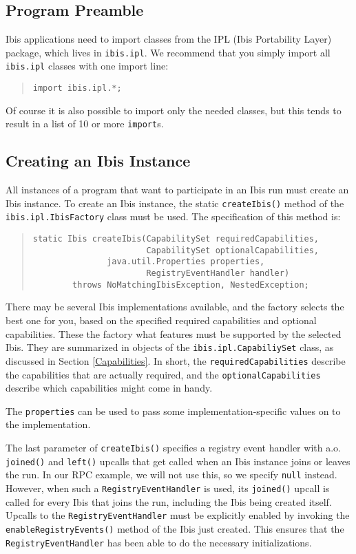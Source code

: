 \documentclass[10pt]{article}
\newcommand{\mysubsection}[1]{\subsection{#1}\label{#1}}
\begin{document}
\subsection{Program Preamble}

Ibis applications need to import classes from the IPL (Ibis
Portability Layer) package, which lives in
\texttt{ibis.ipl}.
We recommend that you simply import all \texttt{ibis.ipl} classes with
one import line:

{\small
\begin{quote}
\begin{verbatim}
import ibis.ipl.*;
\end{verbatim}
\end{quote}
}

\noindent
Of course it is also possible to import only the needed classes, but
this tends to result in a list of 10 or more \texttt{import}s.

\mysubsection{Creating an Ibis Instance}

All instances of a program that want to participate in an Ibis run
must create an Ibis instance.
To create an Ibis instance, the static \texttt{createIbis()} method of the
\texttt{ibis.ipl.IbisFactory} class must be used.
The specification of this method is:
{\small
\begin{quote}
\begin{verbatim}
static Ibis createIbis(CapabilitySet requiredCapabilities,
                       CapabilitySet optionalCapabilities,
		       java.util.Properties properties,
                       RegistryEventHandler handler)
        throws NoMatchingIbisException, NestedException;
\end{verbatim}
\end{quote}
}
There may be several Ibis implementations available, and
the factory selects the best one for you, based on the
specified required capabilities and optional capabilities.
These the factory what features must be supported by the selected Ibis.
They are summarized in objects of the
\texttt{ibis.ipl.CapabiliySet} class, as discussed in Section
\ref{Capabilities}. In short, the \texttt{requiredCapabilities} describe
the capabilities that are actually required, and the
\texttt{optionalCapabilities} describe which capabilities might come in
handy.

The \texttt{properties} can be used to pass some implementation-specific
values on to the implementation. 

The last parameter of \texttt{createIbis()} specifies a registry event
handler with a.o. \texttt{joined()} and \texttt{left()} upcalls that get
called when an Ibis instance joins or leaves the run.
In our RPC example, we will not use this, so we
specify \texttt{null} instead.
However, when such a \texttt{RegistryEventHandler}
is used, its \texttt{joined()} upcall is called for every Ibis that joins the
run, including the Ibis being created itself.
Upcalls to the \texttt{RegistryEventHandler} must be explicitly enabled by
invoking the \texttt{enableRegistryEvents()} method of the Ibis
just created. This ensures that the \texttt{RegistryEventHandler} has been
able to do the necessary initializations.
\end{document}
